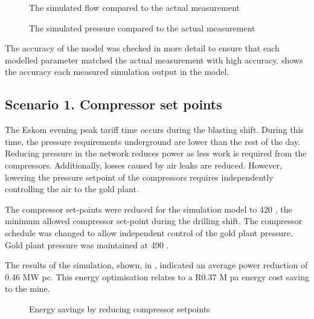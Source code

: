 \begin{figure}[h!]
	\centering
	
	\caption{The simulated flow compared to the actual measurement}
	\label{fig: Verification flow Beatrix}
\end{figure}
\begin{figure}[h!]
	\centering
	
	\caption{The simulated pressure compared to the actual measurement}
	\label{fig: Verification Pressure Beatrix}
\end{figure}
\par
The accuracy of the model was checked in more detail to ensure that each modelled parameter matched the actual measurement with high accuracy.  shows the accuracy each measured simulation output in the model.
\subsection{Scenario 1. Compressor set points}
The Eskom evening peak tariff time occurs during the blasting shift. During this time, the pressure requirements underground are lower than the rest of the day. Reducing pressure in the network reduces power as less work is required from the compressors. Additionally, losses caused by air leaks are reduced. However, lowering the pressure setpoint of the compressors requires independently controlling the air to the gold plant. 
\par 
The compressor set-points were reduced for the simulation model to 420 , the minimum allowed compressor set-point during the drilling shift. The compressor schedule was changed to allow independent control of the gold plant pressure. Gold plant pressure was maintained at 490 . 
\par 
The results of the simulation, shown, in , indicated an average power reduction of 0.46 MW \gls{pc}. This energy optimisation relates to a R0.37 M \gls{pa} energy cost saving to the mine. 
\begin{figure}[h!]
	\centering
	
	\caption{Energy savings by reducing compressor setpoints}
	\label{fig: CompSetpoints Results Beatrix}
\end{figure}

